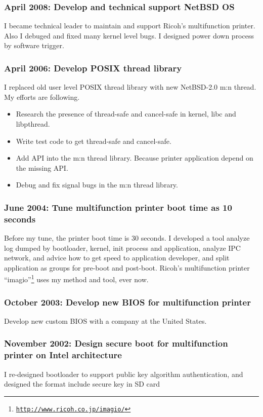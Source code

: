 \documentclass[letterpaper]{article}
\begin{document}
\subsubsection*{April 2008: Develop and technical support NetBSD OS}
I became technical leader to maintain and support Ricoh's multifunction printer.
Also I debuged and fixed many kernel level bugs.
I designed power down process by software trigger.

\subsubsection*{April 2006: Develop POSIX thread library}
I replaced old user level POSIX thread library with new NetBSD-2.0 m:n thread.
My efforts are following.
\begin{itemize}
  \item Research the presence of thread-safe and cancel-safe in kernel, libc and libpthread.
  \item Write test code to get thread-safe and cancel-safe.
  \item Add API into the m:n thread library. Because printer application depend on the missing API.
  \item Debug and fix signal bugs in the m:n thread library.
\end{itemize}

\subsubsection*{June 2004: Tune multifunction printer boot time as 10 seconds}
Before my tune, the printer boot time is 30 seconds.
I developed a tool analyze log dumped by bootloader, kernel, init process and application,
analyze IPC network, and advice how to get speed to application developer,
and split application as groups for pre-boot and post-boot.
Ricoh's multifunction printer ``imagio''\footnote{\href{http://www.ricoh.co.jp/imagio/}{\tt http://www.ricoh.co.jp/imagio/}}
uses my method and tool, ever now.

\subsubsection*{October 2003: Develop new BIOS for multifunction printer}
Develop new custom BIOS with a company at the United States.

\subsubsection*{November 2002: Design secure boot for multifunction printer on Intel architecture}
I re-designed bootloader to support public key algorithm authentication,
and designed the format include secure key in SD card
\end{document}
